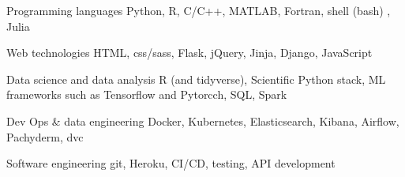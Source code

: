 


\begin{cvskills}


\cvskill
{Programming languages} %
{Python,  R, C/C++, MATLAB, Fortran, shell (bash) , Julia} %


\cvskill
{Web technologies} %
{HTML, css/sass, Flask, jQuery, Jinja, Django, JavaScript } %


\cvskill
{Data science and data analysis} %
{ R (and tidyverse), Scientific Python stack, ML frameworks such as Tensorflow and Pytorcch, SQL, Spark} %




\cvskill
{Dev Ops \& data engineering } %
{Docker, Kubernetes, Elasticsearch, Kibana, Airflow, Pachyderm, dvc} %



\cvskill
{Software engineering } %
{git, Heroku, CI/CD, testing, API development} %




%


\end{cvskills}
